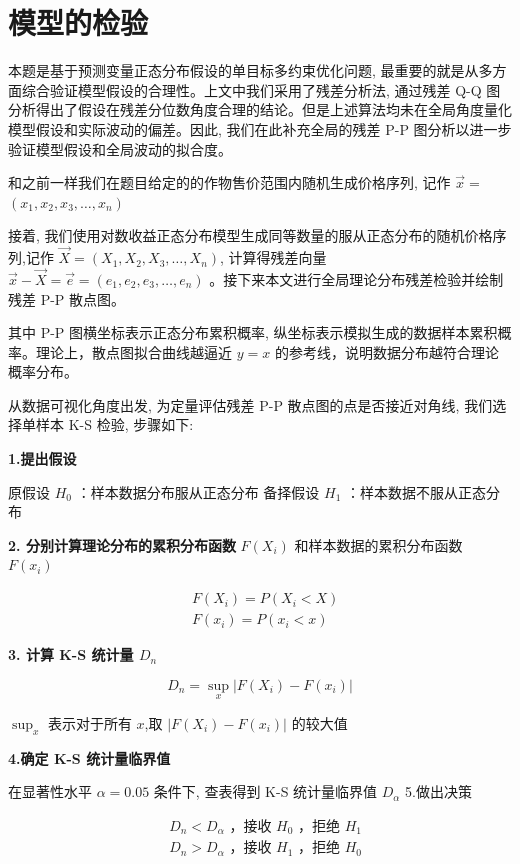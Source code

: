 \documentclass[12pt]{ctexart}
\begin{document}
	\section{模型的检验}  
	\label{sec:validation}  
	本题是基于预测变量正态分布假设的单目标多约束优化问题, 最重要的就是从多方面综合验证模型假设的合理性。上文中我们采用了残差分析法, 通过残差 Q-Q 图分析得出了假设在残差分位数角度合理的结论。但是上述算法均未在全局角度量化模型假设和实际波动的偏差。因此, 我们在此补充全局的残差 P-P 图分析以进一步验证模型假设和全局波动的拟合度。
	
	和之前一样我们在题目给定的的作物售价范围内随机生成价格序列, 记作 $\vec{x}=$ $\left(x_1, x_2, x_3, \ldots, x_n\right)$
	
	接着, 我们使用对数收益正态分布模型生成同等数量的服从正态分布的随机价格序列,记作 $\vec{X}=\left(X_1, X_2, X_3, \ldots, X_n\right)$, 计算得残差向量 $\vec{x}-\vec{X}=\vec{e}=\left(e_1, e_2, e_3, \ldots, e_n\right)$ 。接下来本文进行全局理论分布残差检验并绘制残差 P-P 散点图。
	
	其中 P-P 图横坐标表示正态分布累积概率, 纵坐标表示模拟生成的数据样本累积概率。理论上，散点图拟合曲线越逼近 $y=x$ 的参考线，说明数据分布越符合理论概率分布。
	
	从数据可视化角度出发, 为定量评估残差 P-P 散点图的点是否接近对角线, 我们选择单样本 K-S 检验, 步骤如下:
	
	
	\textbf{1.提出假设}
	
	原假设 $H_0$ ：样本数据分布服从正态分布
	备择假设 $H_1$ ：样本数据不服从正态分布
	
	
	\textbf{2. 分别计算理论分布的累积分布函数} $F\left(X_i\right)$ 和样本数据的累积分布函数 $F\left(x_i\right)$
	
	$$
	\begin{aligned}
		& F\left(X_i\right)=P\left(X_i<X\right) \\
		& F\left(x_i\right)=P\left(x_i<x\right)
	\end{aligned}
	$$
	
	\textbf{3. 计算 K-S 统计量 $D_n$}
	
	$$
	D_n=\sup _x\left|F\left(X_i\right)-F\left(x_i\right)\right|
	$$
	
	$\sup _x$ 表示对于所有 $x$,取 $\left|F\left(X_i\right)-F\left(x_i\right)\right|$ 的较大值
	
	
	\textbf{4.确定 K-S 统计量临界值}
	
	在显著性水平 $\alpha=0.05$ 条件下, 查表得到 K-S 统计量临界值 $D_\alpha$ 5.做出决策
	
	$$
	\begin{aligned}
		& D_n<D_\alpha \text { ，接收 } H_0 \text { ，拒绝 } H_1 \\
		& D_n>D_\alpha \text { ，接收 } H_1 \text { ，拒绝 } H_0
	\end{aligned}
	$$
	
\end{document}
